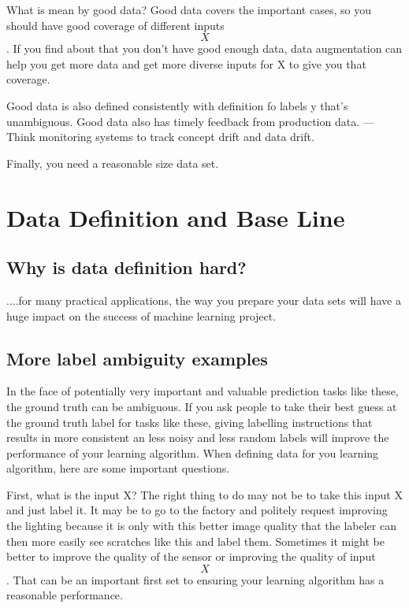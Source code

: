 What is mean by good data?
Good data covers the important cases, so you should have good coverage of different inputs $$X$$.
If you find about that you don't have good enough data, data augmentation can help you get more data and get more diverse inputs for X to give you that coverage.

Good data is also defined consistently with definition fo labels y that's unambiguous.
Good data also has timely feedback from production data.
--- Think monitoring systems to track concept drift and data drift.

Finally, you need a reasonable size data set.

\chapter{Data Definition and Base Line}

\section{Why is data definition hard?}

....for many practical applications, the way you prepare your data sets will have a huge impact on the success of machine learning project.

\section{More label ambiguity examples}

In the face of potentially very important and valuable prediction tasks like these, the ground truth can be ambiguous.
If you ask people to take their best guess at the ground truth label for tasks like these, giving labelling instructions that results in more consistent an less noisy and less random labels will improve the performance of your learning algorithm.
When defining data for you learning algorithm, here are some important questions.

First, what is the input X?
The right thing to do may not be to take this input X and just label it.
It may be to go to the factory and politely request improving the lighting because it is only with this better image quality that the labeler can then more easily see scratches like this and label them.
Sometimes it might be better to improve the quality of the sensor or improving the quality of input $$X$$.
That can be an important first set to ensuring your learning algorithm has a reasonable performance.

